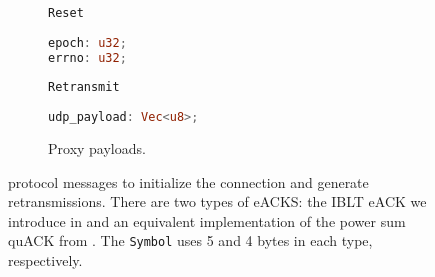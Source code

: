 \begin{figure}[t]
\begin{subfigure}[b]{0.48\linewidth}
\begin{protopayload}{\texttt{Reset}}
            \begin{lstlisting}[language=Rust,basicstyle=\footnotesize]
epoch: u32;
errno: u32;
            \end{lstlisting}
        \end{protopayload}
        \begin{protopayload}{\texttt{Retransmit}}
            \begin{lstlisting}[language=Rust,basicstyle=\footnotesize]
udp_payload: Vec<u8>;
            \end{lstlisting}
        \end{protopayload}
        \caption{Proxy payloads.}
        \label{fig:payloads:proxy}
    \end{subfigure}
  \caption{\Sys protocol messages to initialize the connection and generate
   retransmissions. There are two types of eACKS: the IBLT eACK
   we introduce in  and an equivalent implementation of the
   power sum quACK from \cite{yuan2024sidekick}. The \texttt{Symbol}
   uses 5 and 4 bytes in each type, respectively.}
  \label{fig:payloads}
\end{figure}
